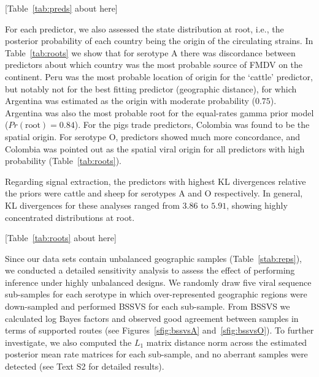 \documentclass[10pt]{article}
\begin{document}
\begin{center}
 [Table~\ref{tab:preds} about here]
\end{center}

For each predictor, we also assessed the state distribution at root, i.e., the posterior probability of each country being the origin of the circulating strains.
In Table~\ref{tab:roots} we show that for serotype A there was discordance between predictors about which country was the most probable source of FMDV on the continent.
Peru was the most probable location of origin for the `cattle' predictor, but notably not for the best fitting predictor (geographic distance), for which Argentina was estimated as the origin with moderate probability ($0.75$).
Argentina was also the most probable root for the equal-rates gamma prior model ($Pr(\text{root})=0.84$).
For the pigs trade predictors, Colombia was found to be the spatial origin.
For serotype O, predictors showed much more concordance, and Colombia was pointed out as the spatial viral origin for all predictors with high probability (Table~\ref{tab:roots}).

Regarding signal extraction, the predictors with highest KL divergences relative the priors were cattle and sheep for serotypes A and O respectively.
In general, KL divergences for these analyses ranged from $3.86$ to $5.91$, showing highly concentrated distributions at root. 

\begin{center}
 [Table~\ref{tab:roots} about here]
\end{center}

Since our data sets contain unbalanced geographic samples (Table~\ref{stab:reps}), we conducted a detailed sensitivity analysis to assess the effect of performing inference under highly unbalanced designs.
We randomly draw five viral sequence sub-samples for each serotype in which over-represented geographic regions were down-sampled and performed BSSVS for each sub-sample.
From BSSVS we calculated log Bayes factors and observed good agreement between samples in terms of supported routes (see Figures~\ref{sfig:bssvsA} and~\ref{sfig:bssvsO}).
To further investigate, we also computed the $L_1$ matrix distance norm across the estimated posterior mean rate matrices for each sub-sample, and no aberrant samples were detected (see Text S2 for detailed results).
\end{document}
